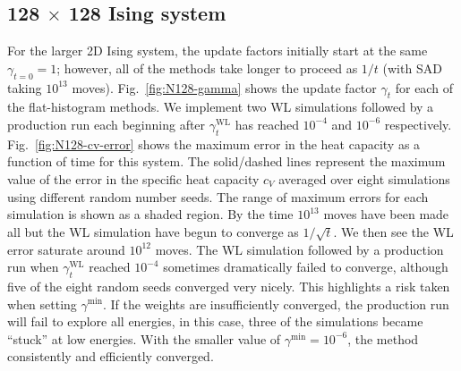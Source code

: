 \subsection{128 $\times$ 128 Ising system}
For the larger 2D Ising system, the update factors initially
start at the same $\gamma_{t=0} = 1$; however, all of the methods take longer
to proceed as $1/t$ (with SAD taking $10^{13}$ moves). Fig.~\ref{fig:N128-gamma} shows the update factor $\gamma_t$ for each of the 
flat-histogram methods. 
We implement two WL simulations followed by a production run each beginning
after $\gamma^{\text{WL}}_t$ has reached $10^{-4}$ and $10^{-6}$ respectively.
Fig.~\ref{fig:N128-cv-error} shows the maximum error in the heat capacity as a 
function of time for this system. The solid/dashed lines represent the maximum
value of the error in the specific heat capacity $c_V$ averaged
over eight simulations using different random number seeds. The range of maximum
errors for each simulation is shown as a shaded region. By
the time $10^{13}$ moves have been made all but the WL simulation have begun to
converge as $1/\sqrt{t}$. We then see the WL error saturate around $10^{12}$
moves.  The WL simulation followed by a production run when
$\gamma^{\text{WL}}_t$ reached $10^{-4}$ sometimes dramatically failed to
converge, although five of the eight random seeds converged very
nicely.  This highlights a risk taken when setting $\gamma^{\min}$.
If the weights are insufficiently converged, the production run will
fail to explore all energies, in this case, three of the simulations became ``stuck'' at low energies. With the smaller value of
$\gamma^{\min}=10^{-6}$, the method consistently and efficiently converged.


